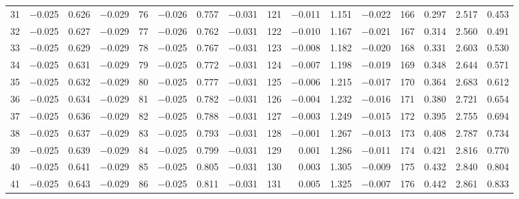 \begin{table}[!h]
{\begin{tabular}{rrrr|rrrr|rrrr|crrr}
 31 & \tiny{ $-$0.025} &   0.626 & \tiny{ $-$0.029} &  76 & \tiny{ $-$0.026} &   0.757 & \tiny{ $-$0.031} & 121 & \tiny{ $-$0.011} &   1.151 & \tiny{ $-$0.022} & 166 & \tiny{  0.297} &   2.517 & \tiny{  0.453}\\
 32 & \tiny{ $-$0.025} &   0.627 & \tiny{ $-$0.029} &  77 & \tiny{ $-$0.026} &   0.762 & \tiny{ $-$0.031} & 122 & \tiny{ $-$0.010} &   1.167 & \tiny{ $-$0.021} & 167 & \tiny{  0.314} &   2.560 & \tiny{  0.491}\\
 33 & \tiny{ $-$0.025} &   0.629 & \tiny{ $-$0.029} &  78 & \tiny{ $-$0.025} &   0.767 & \tiny{ $-$0.031} & 123 & \tiny{ $-$0.008} &   1.182 & \tiny{ $-$0.020} & 168 & \tiny{  0.331} &   2.603 & \tiny{  0.530}\\
 34 & \tiny{ $-$0.025} &   0.631 & \tiny{ $-$0.029} &  79 & \tiny{ $-$0.025} &   0.772 & \tiny{ $-$0.031} & 124 & \tiny{ $-$0.007} &   1.198 & \tiny{ $-$0.019} & 169 & \tiny{  0.348} &   2.644 & \tiny{  0.571}\\
 35 & \tiny{ $-$0.025} &   0.632 & \tiny{ $-$0.029} &  80 & \tiny{ $-$0.025} &   0.777 & \tiny{ $-$0.031} & 125 & \tiny{ $-$0.006} &   1.215 & \tiny{ $-$0.017} & 170 & \tiny{  0.364} &   2.683 & \tiny{  0.612}\\
 36 & \tiny{ $-$0.025} &   0.634 & \tiny{ $-$0.029} &  81 & \tiny{ $-$0.025} &   0.782 & \tiny{ $-$0.031} & 126 & \tiny{ $-$0.004} &   1.232 & \tiny{ $-$0.016} & 171 & \tiny{  0.380} &   2.721 & \tiny{  0.654}\\
 37 & \tiny{ $-$0.025} &   0.636 & \tiny{ $-$0.029} &  82 & \tiny{ $-$0.025} &   0.788 & \tiny{ $-$0.031} & 127 & \tiny{ $-$0.003} &   1.249 & \tiny{ $-$0.015} & 172 & \tiny{  0.395} &   2.755 & \tiny{  0.694}\\
 38 & \tiny{ $-$0.025} &   0.637 & \tiny{ $-$0.029} &  83 & \tiny{ $-$0.025} &   0.793 & \tiny{ $-$0.031} & 128 & \tiny{ $-$0.001} &   1.267 & \tiny{ $-$0.013} & 173 & \tiny{  0.408} &   2.787 & \tiny{  0.734}\\
 39 & \tiny{ $-$0.025} &   0.639 & \tiny{ $-$0.029} &  84 & \tiny{ $-$0.025} &   0.799 & \tiny{ $-$0.031} & 129 & \tiny{  0.001} &   1.286 & \tiny{ $-$0.011} & 174 & \tiny{  0.421} &   2.816 & \tiny{  0.770}\\
 40 & \tiny{ $-$0.025} &   0.641 & \tiny{ $-$0.029} &  85 & \tiny{ $-$0.025} &   0.805 & \tiny{ $-$0.031} & 130 & \tiny{  0.003} &   1.305 & \tiny{ $-$0.009} & 175 & \tiny{  0.432} &   2.840 & \tiny{  0.804}\\
 41 & \tiny{ $-$0.025} &   0.643 & \tiny{ $-$0.029} &  86 & \tiny{ $-$0.025} &   0.811 & \tiny{ $-$0.031} & 131 & \tiny{  0.005} &   1.325 & \tiny{ $-$0.007} & 176 & \tiny{  0.442} &   2.861 & \tiny{  0.833}\\

\end{tabular}}
\end{table}
